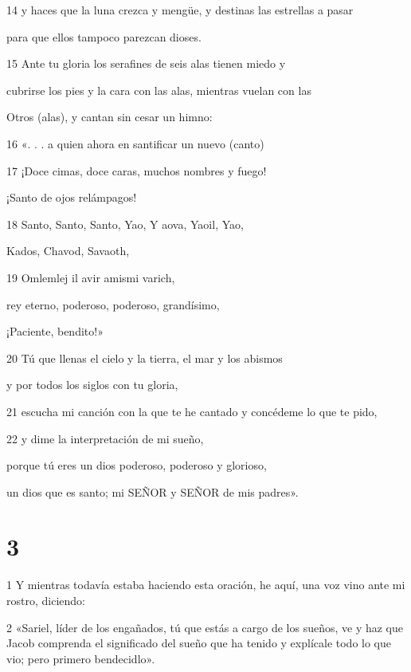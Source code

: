 \par 14 y haces que la luna crezca y mengüe, y destinas las estrellas a pasar
\par para que ellos tampoco parezcan dioses.

\par 15 Ante tu gloria los serafines de seis alas tienen miedo y
\par cubrirse los pies y la cara con las alas, mientras vuelan con las
\par Otros (alas), y cantan sin cesar un himno:

\par 16 «. . . a quien ahora en santificar un nuevo (canto)

\par 17 ¡Doce cimas, doce caras, muchos nombres y fuego!
\par ¡Santo de ojos relámpagos!

\par 18 Santo, Santo, Santo, Yao, Y aova, Yaoil, Yao,
\par Kados, Chavod, Savaoth,

\par 19 Omlemlej il avir amismi varich,
\par rey eterno, poderoso, poderoso, grandísimo,
\par ¡Paciente, bendito!»

\par 20 Tú que llenas el cielo y la tierra, el mar y los abismos
\par y por todos los siglos con tu gloria,

\par 21 escucha mi canción con la que te he cantado y concédeme lo que te pido,

\par 22 y dime la interpretación de mi sueño,
\par porque tú eres un dios poderoso, poderoso y glorioso,
\par un dios que es santo; mi SEÑOR y SEÑOR de mis padres».

\chapter{3}


\par 1 Y mientras todavía estaba haciendo esta oración, he aquí, una voz vino ante mi rostro, diciendo:

\par 2 «Sariel, líder de los engañados, tú que estás a cargo de los sueños, ve y haz que Jacob comprenda el significado del sueño que ha tenido y explícale todo lo que vio; pero primero bendecidlo».

